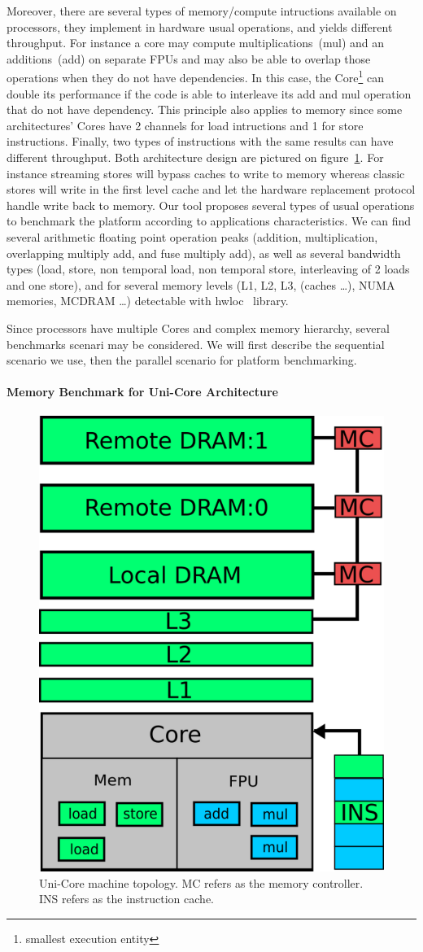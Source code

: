 \documentclass[twoside,twocolumn,8pt]{extarticle}
\begin{document}
Moreover, there are several types of memory/compute intructions available on processors, they implement in hardware usual
operations, and yields different throughput. For instance a core may compute multiplications~(mul) and an additions~(add) on
separate FPUs and may also be able to overlap those operations when they do not have dependencies. In this case, the
Core\footnote{smallest execution entity} can double its performance if the code is able to interleave its add and mul operation
that do not have dependency. This principle also applies to memory since some architectures' Cores have 2 channels for load
intructions and 1 for store instructions. Finally, two types of instructions with the same results can have different throughput.
Both architecture design are pictured on figure~\ref{fig:unicore}.
For instance streaming stores will bypass caches to write to memory whereas classic stores will write in the first level cache and
let the hardware replacement protocol handle write back to memory.
Our tool proposes several types of usual operations to benchmark the platform according to applications characteristics.
We can find several arithmetic floating point operation peaks (addition, multiplication, overlapping multiply add, and fuse
multiply add), as well as several bandwidth types (load, store, non temporal load, non temporal store, interleaving of 2 loads and one store), and for several memory levels (L1, L2, L3, (caches \dots), NUMA memories, MCDRAM \dots) detectable with hwloc~\cite{6903671} library.

Since processors have multiple Cores and complex memory hierarchy, several benchmarks scenari may be considered.
We will first describe the sequential scenario we use, then the parallel scenario for platform benchmarking.

\paragraph{Memory Benchmark for Uni-Core Architecture}
\begin{figure}
  \centering
  \includegraphics[width=.3\textwidth]{pictures/unicore}
  \caption{Uni-Core machine topology. MC refers as the memory controller. INS refers as the instruction cache.}
  \label{fig:unicore}
\end{figure}
\end{document}
